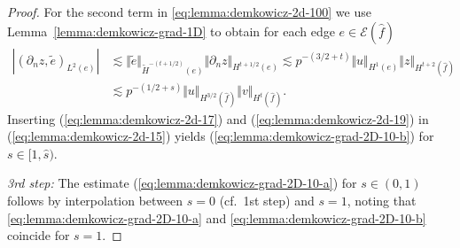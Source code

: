 \documentclass{article}
\begin{document}
\begin{proof}
For the second term in \eqref{eq:lemma:demkowicz-2d-100} we use 
Lemma~\ref{lemma:demkowicz-grad-1D} to obtain for each edge $e\in\mathcal{E}(\widehat{f})$
\begin{align}
\nonumber 
|(\partial_n z,\widetilde{e})_{L^2(e)}| 
&\lesssim \Vert\widetilde{e}\Vert_{\widetilde{H}^{-(t+1/2)}(e)} \Vert\partial_n z\Vert_{H^{t+1/2}(e)} \lesssim p^{-(3/2+t)} \Vert u\Vert_{H^{1}(e)} \Vert z\Vert_{H^{t+2}(\widehat{f})} \\
\label{eq:lemma:demkowicz-2d-19}
& \lesssim p^{-(1/2+s)} \Vert u\Vert_{H^{3/2}(\widehat{f})} \Vert v\Vert_{H^t(\widehat{f})}.
\end{align}
Inserting 
(\ref{eq:lemma:demkowicz-2d-17}) and (\ref{eq:lemma:demkowicz-2d-19}) 
in 
(\ref{eq:lemma:demkowicz-2d-15}) yields 
(\ref{eq:lemma:demkowicz-grad-2D-10-b}) for $s\in [1,\widehat{s})$. 

\emph{3rd step:}
The estimate
(\ref{eq:lemma:demkowicz-grad-2D-10-a}) for $s \in (0,1)$ follows by interpolation between 
$s = 0$ (cf.~1st step) and $s = 1$, noting that 
\eqref{eq:lemma:demkowicz-grad-2D-10-a} and \eqref{eq:lemma:demkowicz-grad-2D-10-b} coincide for $s = 1$. 


\end{proof}
\end{document}
